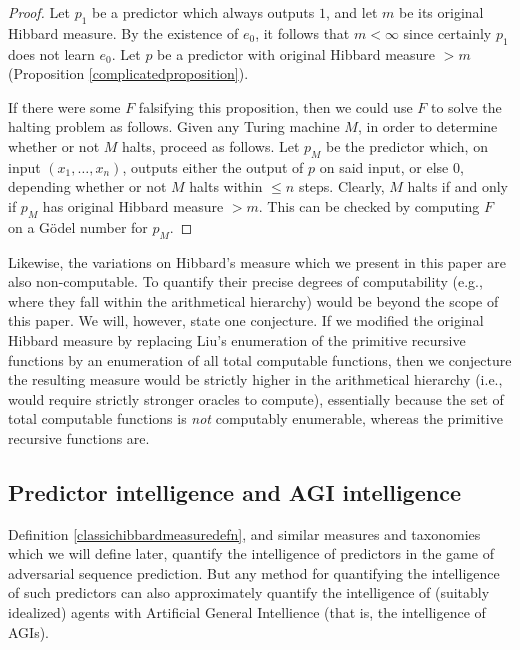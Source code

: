 \documentclass[twoside,11pt]{article}
\begin{document}
\begin{proof}
    Let $p_1$ be a predictor which always outputs $1$, and let $m$ be its
    original Hibbard measure. By the existence of $e_0$, it
    follows that $m<\infty$ since certainly $p_1$ does not learn $e_0$.
    Let $p$ be a predictor with
    original Hibbard measure $>m$
    (Proposition \ref{complicatedproposition}).

    If there were some $F$ falsifying this proposition, then we could use $F$ to solve
    the halting problem as follows.
    Given any Turing machine $M$, in order to determine whether or not $M$ halts,
    proceed as follows. Let $p_M$ be the predictor which, on
    input $(x_1,\ldots,x_n)$, outputs either the output of $p$ on said input,
    or else $0$, depending whether or not $M$ halts within
    $\leq n$ steps. Clearly, $M$ halts if and only if $p_M$ has
    original Hibbard measure $>m$. This can be checked by computing $F$ on a
    G\"odel number for $p_M$.
\end{proof}

Likewise, the variations on Hibbard's measure which we present in this paper are also
non-computable. To quantify their precise degrees of computability (e.g., where they
fall within the arithmetical hierarchy) would be beyond the scope of this paper.
We will, however, state one conjecture. If we modified the original Hibbard
measure by replacing Liu's enumeration of the primitive recursive functions by an
enumeration of all total computable functions, then we conjecture the resulting measure would
be strictly higher in the arithmetical hierarchy (i.e., would require strictly
stronger oracles to compute), essentially because the set of total computable functions
is \emph{not} computably enumerable, whereas the primitive recursive functions are.

\subsection{Predictor intelligence and AGI intelligence}
\label{agiproxysection}

Definition \ref{classichibbardmeasuredefn}, and similar measures and taxonomies
which we will
define later, quantify the intelligence of predictors in the game of
adversarial sequence prediction.
But any method for quantifying the intelligence of such predictors can also
approximately quantify the intelligence of (suitably idealized)
agents with Artificial General Intellience (that is, the intelligence of AGIs).
\end{document}
